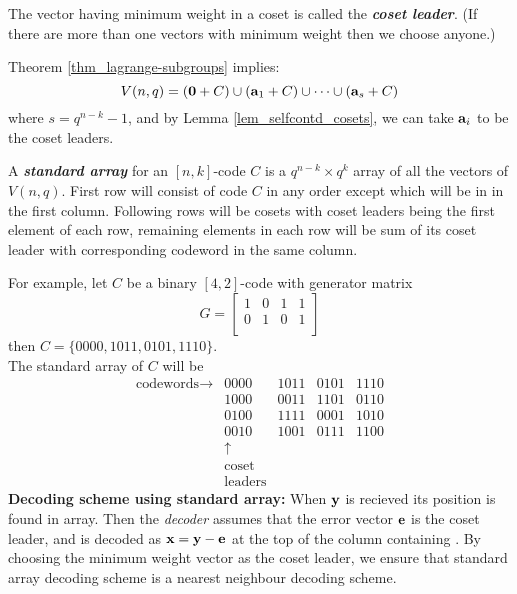 \documentclass[../main.tex]{subfiles}
\newcommand{\coset}[1]{\code{#1}+C}
\begin{document}
\begin{defn}
	The vector having minimum weight in a coset is called the \textbf{\emph{coset leader}}. (If there are more than one vectors with minimum weight then we choose anyone.)
\end{defn}

Theorem \ref{thm_lagrange-subgroups} implies:
\[
	V(n,q)=(\coset{0})\cup (\code{a}_1+C)\cup \cdots \cup (\code{a}_s+C)
\]
where $s=q^{n-k}-1$, and by Lemma \ref{lem_selfcontd_cosets}, we can take $\textbf{a}_i$ to be the coset leaders.\\
\begin{defn}
	A \textbf{\emph{standard array}} for an $[n,k]$-code $C$ is a $q^{n-k}\times q^k$ array of all the vectors of $V(n,q)$. First row will consist of code $C$ in any order except  which will be in in the first column. Following rows will be cosets with coset leaders being the first element of each row, remaining elements in each row will be sum of its coset leader with corresponding codeword in the same column. 
\end{defn}
For example, let $C$ be a binary $[4,2]$-code with generator matrix 
\[
	G = \begin{bmatrix}
		1 & 0 & 1 & 1\\
		0 & 1 & 0 & 1\\
	\end{bmatrix}
\]
then $C=\{0000,1011,0101,1110\}$.\\
The standard array of $C$ will be
\[
	\begin{matrix}
		\text{codewords}\rightarrow & 0000 & 1011 & 0101 & 1110\\
									& 1000 & 0011 & 1101 & 0110\\
									& 0100 & 1111 & 0001 & 1010\\
									& 0010 & 1001 & 0111 & 1100\\
									& \uparrow\\
									&\text{coset}\\
									&\text{leaders}
 	\end{matrix}
\]
\textbf{Decoding scheme using standard array:} When $\textbf{y}$ is recieved its position is found in array. Then the \emph{decoder} assumes that the error vector $\textbf{e}$ is the coset leader, and  is decoded as $\textbf{x}=\textbf{y}-\textbf{e}$ at the top of the column containing . By choosing the minimum weight vector as the coset leader, we ensure that standard array decoding scheme is a nearest neighbour decoding scheme.
\end{document}
